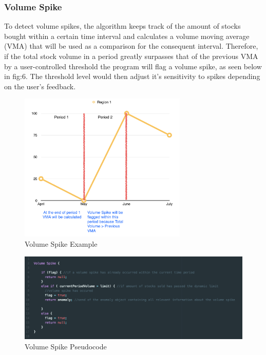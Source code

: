 \documentclass[12pt]{article}
\begin{document}
    \subsubsection{Volume Spike}
    To detect volume spikes, the algorithm keeps track of the amount of stocks bought within a certain time interval and calculates a volume moving average (VMA) that will be used as a comparison for the consequent interval. Therefore, if the total stock
    volume in a period greatly surpasses that of the previous VMA by a user-controlled threshold the program will flag a volume spike, as seen below in fig:6. The threshold level would then adjust it's sensitivity to spikes depending on the user's feedback.
    \begin{figure}[H]
    \centering
    \includegraphics[width=80mm]{VSGraph.png}
    \caption{Volume Spike Example}
    \end{figure}
    \begin{figure}[H]
    \centering
    \includegraphics[width=150mm]{VSpseudo.png}
    \caption{Volume Spike Pseudocode}
    \end{figure}
\end{document}
